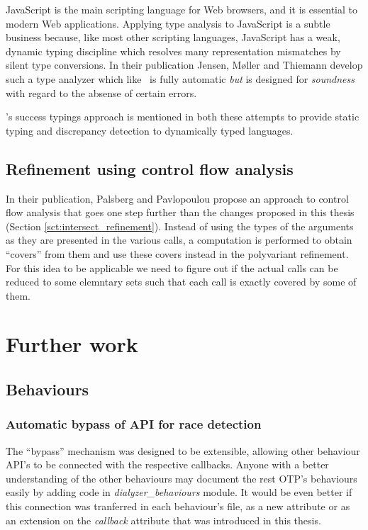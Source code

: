 JavaScript is the main scripting language for Web browsers, and it is
essential to modern Web applications. Applying type analysis to
JavaScript is a subtle business because, like most other scripting
languages, JavaScript has a weak, dynamic typing discipline which
resolves many representation mismatches by silent type conversions. In
their publication\cite{javascript} Jensen, M\o ller and Thiemann
develop such a type analyzer which like \dr\ is fully automatic
\emph{but} is designed for \emph{soundness} with regard to the absense
of certain errors.

\dr's success typings approach is mentioned in both these attempts to
provide static typing and discrepancy detection to dynamically typed
languages.

\subsection{Refinement using control flow analysis}

In their publication, Palsberg and Pavlopoulou \cite{polyvariant}
propose an approach to control flow analysis that goes one step
further than the changes proposed in this thesis (Section
\ref{sct:intersect_refinement}). Instead of using the types of the
arguments as they are presented in the various calls, a computation is
performed to obtain ``covers'' from them and use these covers instead
in the polyvariant refinement. For this idea to be applicable we need
to figure out if the actual calls can be reduced to some elemntary
sets such that each call is exactly covered by some of them.

\section{Further work}
\label{sct:further_work}

\subsection{Behaviours}
\subsubsection{Automatic bypass of API for race detection}

The ``bypass'' mechanism was designed to be extensible, allowing other
behaviour API's to be connected with the respective callbacks. Anyone
with a better understanding of the other behaviours may document the
rest OTP's behaviours easily by adding code in
\emph{dialyzer\_behaviours} module. It would be even better if this
connection was tranferred in each behaviour's file, as a new attribute
or as an extension on the \emph{callback} attribute that was
introduced in this thesis.

